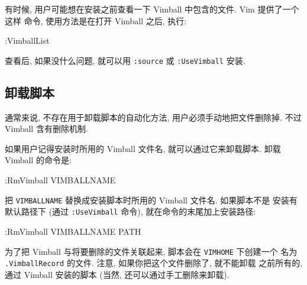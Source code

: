 有时候, 用户可能想在安装之前查看一下 Vimball 中包含的文件. Vim 提供了一个这样
命令, 使用方法是在打开 Vimball 之后, 执行:
\begin{vimcode}
:VimballList
\end{vimcode}

查看后, 如果没什么问题, 就可以用 \texttt{:source} 或 \texttt{:UseVimball}
安装.

\subsection{卸载脚本}
\label{subsec:uninstalling_scripts}

通常来说, 不存在用于卸载脚本的自动化方法, 用户必须手动地把文件删除掉. 不过
Vimball 含有删除机制.

如果用户记得安装时所用的 Vimball 文件名, 就可以通过它来卸载脚本. 卸载 Vimball
的命令是:
\begin{vimcode}
:RmVimball VIMBALLNAME
\end{vimcode}
把 \texttt{VIMBALLNAME} 替换成安装脚本时所用的 Vimball 文件名. 如果脚本不是
安装有默认路径下 (通过 \texttt{:UseVimball} 命令), 就在命令的末尾加上安装路径:
\begin{vimcode}
:RmVimball VIMBALLNAME PATH
\end{vimcode}

为了把 Vimball 与将要删除的文件关联起来, 脚本会在 \texttt{VIMHOME} 下创建一个
名为 \texttt{.VimballRecord} 的文件. 注意, 如果你把这个文件删除了, 就不能卸载
之前所有的, 通过 Vimball 安装的脚本 (当然, 还可以通过手工删除来卸载).
